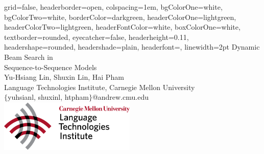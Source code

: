 \documentclass[a0paper,portrait]{baposter}
\begin{document}

\begin{poster}
{
grid=false,
headerborder=open, %
colspacing=1em, %
bgColorOne=white, %
bgColorTwo=white, %
borderColor=darkgreen, %
headerColorOne=lightgreen, %
headerColorTwo=lightgreen, %
headerFontColor=white, %
boxColorOne=white, %
textborder=rounded, %
eyecatcher=false, %
headerheight=0.11\textheight, %
headershape=rounded, %
headershade=plain,
headerfont=\Large\textsf, %
linewidth=2pt %
}
{}
%
%
{
\textsf %
{Dynamic Beam Search in\\Sequence-to-Sequence Models
}
} %
{\sf\vspace{0.5em}\\
Yu-Hsiang Lin, Shuxin Lin, Hai Pham
\vspace{0.1em}\\
\small{Language Technologies Institute, Carnegie Mellon University
\vspace{0.2em}\\
$\{$yuhsianl, shuxinl, htpham$\}$@andrew.cmu.edu}
}
	{\includegraphics[width=6.5cm]{LTI-logo.png}} %



\end{poster}
\end{document}
